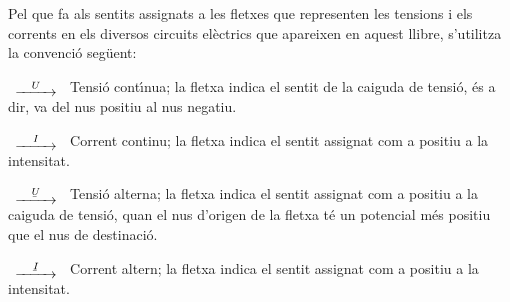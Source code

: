 Pel que fa als sentits assignats a les fletxes que representen les
tensions i els corrents en els diversos circuits el\`{e}ctrics que
apareixen en aquest llibre, s'utilitza la convenci\'{o} seg\"{u}ent:

\begin{list}{}
{\setlength{\labelwidth}{15mm} \setlength{\leftmargin}{20mm}
\setlength{\labelsep}{5mm}}
    \item[$\begin{CD} @>U>> \end{CD}$] Tensi\'{o} cont\'{\i}nua; la fletxa indica el sentit
    de la caiguda de tensi\'{o}, \'{e}s a dir, va del nus positiu al nus negatiu.
    \item[$\begin{CD} @>I>> \end{CD}$] Corrent
    continu; la fletxa indica el sentit  assignat com a positiu a la
    intensitat.
    \item[$\begin{CD} @>\cmplx{U}>> \end{CD}$] Tensi\'{o} alterna; la fletxa indica el
    sentit assignat com a positiu a la caiguda de tensi\'{o}, quan el nus d'origen de la fletxa
    t\'{e} un potencial  m\'{e}s positiu que el nus de destinaci\'{o}.
    \item[$\begin{CD} @>\cmplx{I}>> \end{CD}$] Corrent altern; la fletxa
    indica el sentit  assignat com a positiu a la
    intensitat.
\end{list}

\pagebreak

